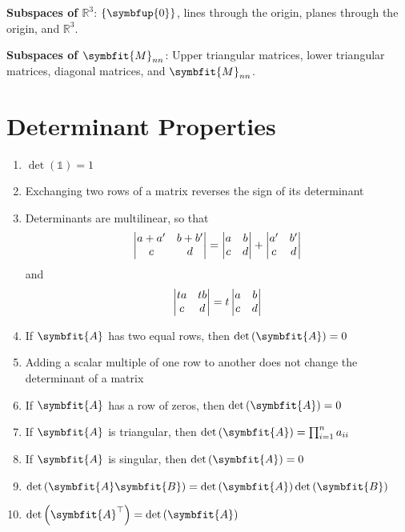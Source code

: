 \documentclass{article}
\begin{document}
\begin{multicols*}{2}
    \textbf{Subspaces of $\mathbb{R}^3$}: $\left\{ \symbfup{0} \right\}$,
    lines through the origin, planes through the origin, and $\mathbb{R}^3$.

    \textbf{Subspaces of $\symbfit{M}_{nn}$}: Upper triangular matrices,
    lower triangular matrices, diagonal matrices, and $\symbfit{M}_{nn}$.
    \section*{Determinant Properties}
    \begin{enumerate}
        \item $\det{\left( \mathbb{1} \right)}=1$
        \item Exchanging two rows of a matrix reverses the sign of its determinant
        \item Determinants are multilinear, so that
              \begin{equation*}
                  \mdet{a+a' & b+b' \\ c & d}
                  = \mdet{a & b \\ c & d}+\mdet{a' & b' \\ c & d}
              \end{equation*}
              and
              \begin{equation*}
                  \mdet{ta & tb \\ c & d}=t\mdet{a & b \\ c & d}
              \end{equation*}
        \item If $\symbfit{A}$ has two equal rows, then $\det{\left( \symbfit{A} \right)}=0$
        \item Adding a scalar multiple of one row to another does not change the determinant of a matrix
        \item If $\symbfit{A}$ has a row of zeros, then $\det{\left( \symbfit{A} \right)}=0$
        \item If $\symbfit{A}$ is triangular, then $\det{\left( \symbfit{A} \right)}=\prod_{i=1}^{n} a_{ii}$
        \item If $\symbfit{A}$ is singular, then $\det{\left( \symbfit{A} \right)}=0$
        \item $\det{\left( \symbfit{A}\symbfit{B} \right)} = \det{\left( \symbfit{A} \right)}\det{\left( \symbfit{B} \right)}$
        \item $\det{\left( \symbfit{A}^\top \right)} = \det{\left( \symbfit{A} \right)}$
    \end{enumerate}

\end{multicols*}
\end{document}
